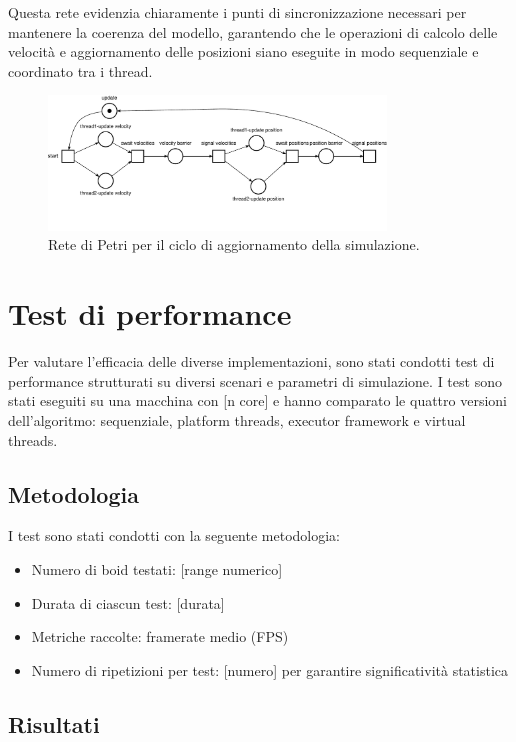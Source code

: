 \documentclass[a4paper,12pt]{report}
\begin{document}
Questa rete evidenzia chiaramente i punti di sincronizzazione necessari per mantenere la coerenza del modello, garantendo che le operazioni di calcolo delle velocità e aggiornamento delle posizioni siano eseguite in modo sequenziale e coordinato tra i thread.

\begin{figure}[h!]
    \centering
    \includegraphics[width=0.8\textwidth]{rete_update_cycle.pdf}
    \caption{Rete di Petri per il ciclo di aggiornamento della simulazione.}
    \label{fig:rete_update_cycle}
\end{figure}

\chapter{Test di performance}
Per valutare l'efficacia delle diverse implementazioni, sono stati condotti test di performance strutturati su diversi scenari e parametri di simulazione. I test sono stati eseguiti su una macchina con [n core] e hanno comparato le quattro versioni dell'algoritmo: sequenziale, platform threads, executor framework e virtual threads.

\section{Metodologia}
I test sono stati condotti con la seguente metodologia:
\begin{itemize}
    \item Numero di boid testati: [range numerico]
    \item Durata di ciascun test: [durata]
    \item Metriche raccolte: framerate medio (FPS)
    \item Numero di ripetizioni per test: [numero] per garantire significatività statistica
\end{itemize}

\section{Risultati}
\end{document}

